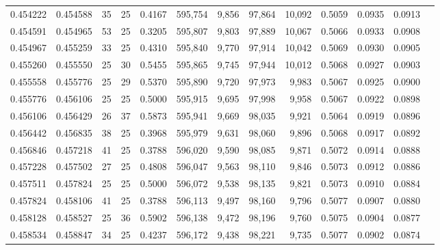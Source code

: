 \begin{tabular}{rrrrrrrrrrrrr}
0.454222 & 0.454588 &    35 &  25 &                                     0.4167 & 595,754 &   9,856 &  97,864 &  10,092 & 0.5059 & 0.0935 & 0.0913 \\
0.454591 & 0.454965 &    53 &  25 &                                     0.3205 & 595,807 &   9,803 &  97,889 &  10,067 & 0.5066 & 0.0933 & 0.0908 \\
0.454967 & 0.455259 &    33 &  25 &                                     0.4310 & 595,840 &   9,770 &  97,914 &  10,042 & 0.5069 & 0.0930 & 0.0905 \\
0.455260 & 0.455550 &    25 &  30 &                                     0.5455 & 595,865 &   9,745 &  97,944 &  10,012 & 0.5068 & 0.0927 & 0.0903 \\
0.455558 & 0.455776 &    25 &  29 &                                     0.5370 & 595,890 &   9,720 &  97,973 &   9,983 & 0.5067 & 0.0925 & 0.0900 \\
0.455776 & 0.456106 &    25 &  25 &                                     0.5000 & 595,915 &   9,695 &  97,998 &   9,958 & 0.5067 & 0.0922 & 0.0898 \\
0.456106 & 0.456429 &    26 &  37 &                                     0.5873 & 595,941 &   9,669 &  98,035 &   9,921 & 0.5064 & 0.0919 & 0.0896 \\
0.456442 & 0.456835 &    38 &  25 &                                     0.3968 & 595,979 &   9,631 &  98,060 &   9,896 & 0.5068 & 0.0917 & 0.0892 \\
0.456846 & 0.457218 &    41 &  25 &                                     0.3788 & 596,020 &   9,590 &  98,085 &   9,871 & 0.5072 & 0.0914 & 0.0888 \\
0.457228 & 0.457502 &    27 &  25 &                                     0.4808 & 596,047 &   9,563 &  98,110 &   9,846 & 0.5073 & 0.0912 & 0.0886 \\
0.457511 & 0.457824 &    25 &  25 &                                     0.5000 & 596,072 &   9,538 &  98,135 &   9,821 & 0.5073 & 0.0910 & 0.0884 \\
0.457824 & 0.458106 &    41 &  25 &                                     0.3788 & 596,113 &   9,497 &  98,160 &   9,796 & 0.5077 & 0.0907 & 0.0880 \\
0.458128 & 0.458527 &    25 &  36 &                                     0.5902 & 596,138 &   9,472 &  98,196 &   9,760 & 0.5075 & 0.0904 & 0.0877 \\
0.458534 & 0.458847 &    34 &  25 &                                     0.4237 & 596,172 &   9,438 &  98,221 &   9,735 & 0.5077 & 0.0902 & 0.0874 \\

\end{tabular}
